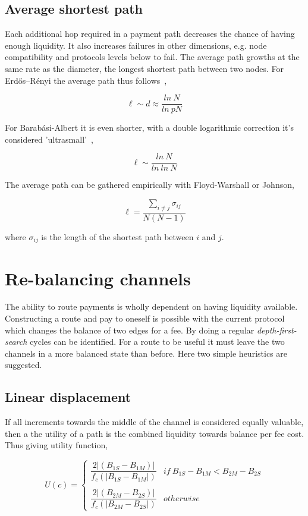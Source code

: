 \subsection{Average shortest path}

Each additional hop required in a payment \gls{path} decreases the chance of having enough liquidity. It also increases failures in other dimensions, e.g. \gls{node} compatibility and protocols levels below to fail. The average path growths at the same rate as the diameter, the longest shortest path between two nodes. For Erdős–Rényi the average path thus follows~\cite{watts:stragatz:small:networks},

\[ \ell \sim d \approx \dfrac{ln~N}{ln~pN} \]

For Barabási-Albert it is even shorter, with a double logarithmic correction it's considered 'ultrasmall'~\cite{cohen:havlin:ultrasmall},

\[ \ell \sim \dfrac{ln~N}{ln~ln~N} \]

The average path can be gathered empirically with Floyd-Warshall or Johnson,

\[ \ell = \dfrac{\sum_{i \neq j} \sigma_{ij}}{N(N-1)} \]

where $\sigma_{ij}$ is the length of the shortest \gls{path} between $i$ and $j$.

\section{Re-balancing channels}

The ability to route payments is wholly dependent on having liquidity available. Constructing a route and pay to oneself is possible with the current protocol which changes the balance of two edges for a fee. By doing a regular \textit{depth-first-search} cycles can be identified. For a route to be useful it must leave the two channels in a more balanced state than before. Here two simple heuristics are suggested. 

\subsection{Linear displacement}
\label{sec:linear:displacement}
If all increments towards the middle of the channel is considered equally valuable, then a the utility of a path is the combined liquidity towards balance per fee cost. Thus giving utility function,

\[ U(c) = \begin{cases} 
\dfrac{2|(B_{1S} - B_{1M})|}{f_c(|B_{1S} - B_{1M}|)}  & if~B_{1S} - B_{1M} < B_{2M} - B_{2S} \\ 
\\
\dfrac{2|(B_{2M} - B_{2S})|}{f_c(|B_{2M} - B_{2S}|)}  & otherwise
\end{cases} \]

